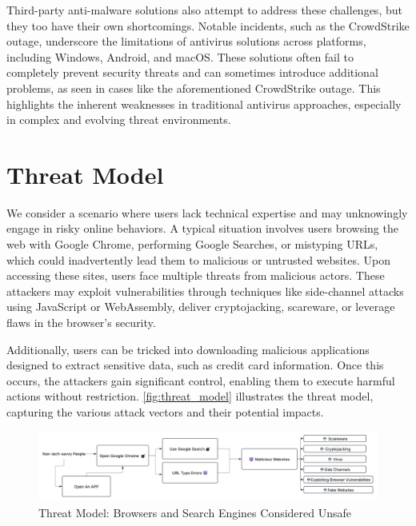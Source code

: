 Third-party anti-malware solutions also attempt to address these challenges, but they too have their own shortcomings. Notable incidents, such as the CrowdStrike outage, underscore the limitations of antivirus solutions across platforms, including Windows, Android, and macOS. These solutions often fail to completely prevent security threats and can sometimes introduce additional problems, as seen in cases like the aforementioned CrowdStrike outage. This highlights the inherent weaknesses in traditional antivirus approaches, especially in complex and evolving threat environments.

\section{Threat Model}
We consider a scenario where users lack technical expertise and may unknowingly engage in risky online behaviors. A typical situation involves users browsing the web with Google Chrome, performing Google Searches, or mistyping URLs, which could inadvertently lead them to malicious or untrusted websites. Upon accessing these sites, users face multiple threats from malicious actors. These attackers may exploit vulnerabilities through techniques like side-channel attacks using JavaScript or WebAssembly, deliver cryptojacking, scareware\cite{scarewareBlocker}, or leverage flaws in the browser's security.

Additionally, users can be tricked into downloading malicious applications designed to extract sensitive data, such as credit card information. Once this occurs, the attackers gain significant control, enabling them to execute harmful actions without restriction. \autoref{fig:threat_model} illustrates the threat model, capturing the various attack vectors and their potential impacts.

\begin{figure}[h!]
\centering
\includegraphics[width=1\textwidth]{threatmodel.png}
\caption{Threat Model: Browsers and Search Engines Considered Unsafe}
\label{fig:threat_model} %
\end{figure}